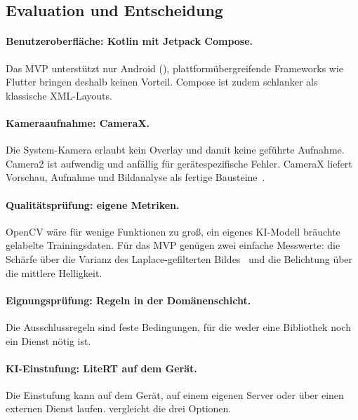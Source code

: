 \subsection{Evaluation und Entscheidung}
\label{sec:evaluation}

\paragraph{Benutzeroberfläche: Kotlin mit Jetpack Compose.} Das MVP unterstützt nur Android (), plattformübergreifende Frameworks wie Flutter bringen deshalb keinen Vorteil. Compose ist zudem schlanker als klassische XML-Layouts.

\paragraph{Kameraaufnahme: CameraX.} Die System-Kamera erlaubt kein Overlay und damit keine geführte Aufnahme. Camera2 ist aufwendig und anfällig für gerätespezifische Fehler. CameraX liefert Vorschau, Aufnahme und Bildanalyse als fertige Bausteine~\cite{android-camerax}.

\paragraph{Qualitätsprüfung: eigene Metriken.} OpenCV wäre für wenige Funktionen zu groß, ein eigenes KI-Modell bräuchte gelabelte Trainingsdaten. Für das MVP genügen zwei einfache Messwerte: die Schärfe über die Varianz des Laplace-gefilterten Bildes~\cite{pechpacheco2000} und die Belichtung über die mittlere Helligkeit.

\paragraph{Eignungsprüfung: Regeln in der Domänenschicht.} Die Ausschlussregeln sind feste Bedingungen, für die weder eine Bibliothek noch ein Dienst nötig ist.

\paragraph{KI-Einstufung: LiteRT auf dem Gerät.} Die Einstufung kann auf dem Gerät, auf einem eigenen Server oder über einen externen Dienst laufen.  vergleicht die drei Optionen.

